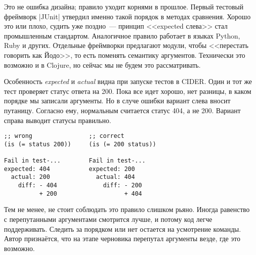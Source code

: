 Это не ошибка дизайна; правило уходит корнями в прошлое. Первый тестовый
фреймворк \spverb|JUnit| утвердил именно такой порядок в методах сравнения. Хорошо это
или плохо, судить уже поздно~--- принцип <<expected слева>> стал промышленным
стандартом. Аналогичное правило работает в языках Python, Ruby и
других. Отдельные фреймворки предлагают модули, чтобы <<перестать говорить как
Йодо>>, то есть поменять семантику аргументов. Технически это возможно и в
Clojure, но сейчас мы не будем это рассматривать.

Особенность \emph{expected} и \emph{actual} видна при запуске тестов в
CIDER. Один и тот же тест проверяет статус ответа на 200. Пока все идет хорошо,
нет разницы, в каком порядке мы записали аргументы. Но в случе ошибки вариант
слева вносит путаницу. Согласно ему, нормальным считается статус 404, а не
200. Вариант справа выводит статусы правильно.

\begin{verbatim}
;; wrong                ;; correct
(is (= status 200))     (is (= 200 status))

Fail in test-...        Fail in test-...
expected: 404           expected: 200
  actual: 200             actual: 404
    diff: - 404             diff: - 200
          + 200                   + 404
\end{verbatim}

Тем не менее, не стоит соблюдать это правило слишком рьяно. Иногда равенство с
перепутанными аргументами смотрится лучше, и потому код легче
поддерживать. Следить за порядком или нет остается на усмотрение команды. Автор
признаётся, что на этапе черновика перепутал аргументы везде, где это возможно.

